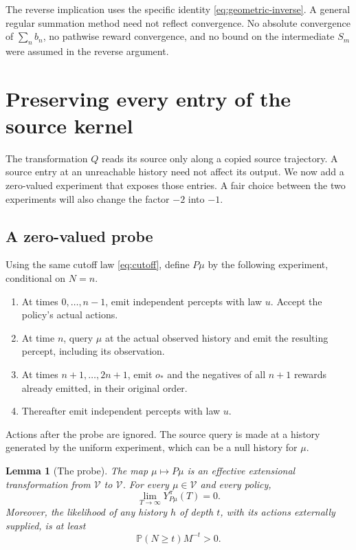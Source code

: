 \documentclass[11pt]{article}
\newtheorem{lemma}[theorem]{Lemma}
\theoremstyle{definition}
\theoremstyle{remark}
\newcommand{\V}{\mathcal V}
\newcommand{\Prob}{\mathbb P}
\begin{document}
The reverse implication uses the specific identity
\eqref{eq:geometric-inverse}.  A general regular summation method need
not reflect convergence.  No absolute convergence of
$\sum_n b_n$, no pathwise reward convergence, and no bound on the
intermediate $S_m$ were assumed in the reverse argument.

\section{Preserving every entry of the source kernel}
\label{sec:embedding}

The transformation $Q$ reads its source only along a copied source
trajectory.  A source entry at an unreachable history need not affect
its output.  We now add a zero-valued experiment that exposes those
entries.  A fair choice between the two experiments will also change
the factor $-2$ into $-1$.

\subsection{A zero-valued probe}

Using the same cutoff law \eqref{eq:cutoff}, define $P\mu$ by the
following experiment, conditional on $N=n$.
\begin{enumerate}[label=\arabic*.,leftmargin=*]
\item At times $0,\ldots,n-1$, emit independent percepts with law $u$.
      Accept the policy's actual actions.
\item At time $n$, query $\mu$ at the actual observed history and emit
      the resulting percept, including its observation.
\item At times $n+1,\ldots,2n+1$, emit $o_*$ and the negatives of all
      $n+1$ rewards already emitted, in their original order.
\item Thereafter emit independent percepts with law $u$.
\end{enumerate}
Actions after the probe are ignored.  The source query is made at a
history generated by the uniform experiment, which can be a null
history for $\mu$.

\begin{lemma}[The probe]
\label{lem:probe}
The map $\mu\mapsto P\mu$ is an effective extensional transformation
from $\V$ to $\V$.  For every $\mu\in\V$ and every policy,
\begin{equation}
  \lim_{T\to\infty}Y_{P\mu}^{\pi}(T)=0.
  \label{eq:probe-zero}
\end{equation}
Moreover, the likelihood of any history $h$ of depth $t$, with its
actions externally supplied, is at least
\begin{equation}
  \Prob(N\ge t)M^{-t}>0.
  \label{eq:probe-support}
\end{equation}
\end{lemma}
\end{document}
